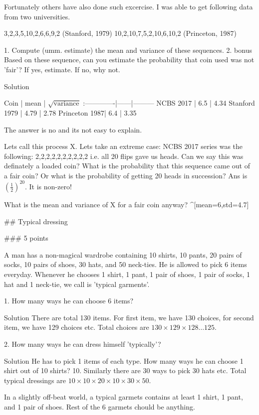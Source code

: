 \documentclass[a4paper,10pt]{article}
\begin{document}
Fortunately others have also done such excercise. I was able to get following
data from two universities.

    3,2,3,5,10,2,6,6,9,2     (Stanford, 1979)
    10,2,10,7,5,2,10,6,10,2  (Princeton, 1987)

1. Compute (umm. estimate) the mean and variance of these sequences.
2. bonus Based on these sequence, can you estimate the probability that coin used
was not 'fair'? If yes, estimate. If no, why not.

Solution 

 Coin         | mean | $\sqrt{\text{variance}}$
:-------------|------|---------
NCBS 2017     | 6.5  | 4.34 
Stanford 1979 | 4.79 | 2.78 
Princeton 1987| 6.4  | 3.35 

The answer is no and its not easy to explain.

Lets call this process X. Lets take an extreme case: NCBS 2017 series was the
following: 2,2,2,2,2,2,2,2,2,2 i.e. all 20 flips gave us heads. Can we say this
was definately a loaded coin? What is the probability that this sequence came
out of a fair coin? Or what is the probability of getting 20 heads in
succession? Ans is $(\frac{1}{2})^{20}$. It is non-zero!

What is the mean and variance of X for a fair coin anyway? ^[mean=6,std=4.7]

## Typical dressing 

### 5 points

A man has a non-magical wardrobe containing 10 shirts, 10 pants, 20 pairs of
socks, 10 pairs of shoes, 30 hats, and 50 neck-ties.  He is allowed to pick 6
items everyday. Whenever he chooses 1 shirt, 1 pant, 1 pair of
shoes, 1 pair of socks, 1 hat and 1 neck-tie, we call is 'typical garments'.

1. How many ways he can choose 6 items? 

Solution There are total 130 items.  For first item, we have 130 choices,
for second item, we have 129 choices etc. Total choices are $130 \times 129
    \times 128 \ldots 125$.

2. How many ways he can dress himself 'typically'?

Solution He has to pick 1 items of each type. How many ways he can choose 1
shirt out of 10 shirts? 10. Similarly there are 30 ways to pick 30 hats etc.
Total typical dressings are $10 \times 10 \times 20 \times 10 \times 30 \times
50$.

In a slightly off-beat world, a typical garmets contains at least 1 shirt, 1
pant, and 1 pair of shoes. Rest of the 6 garmets chould be anything.
\end{document}
